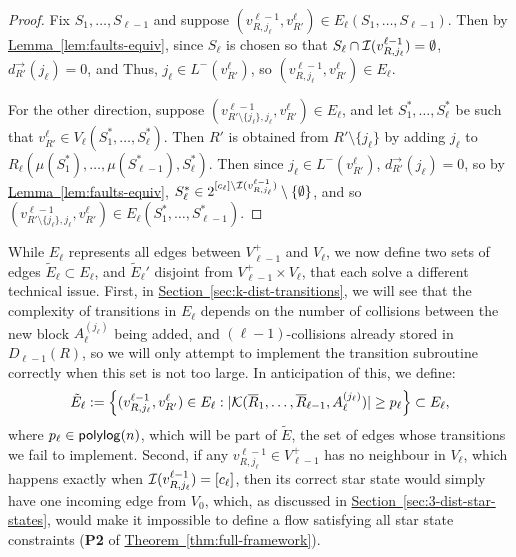 \documentclass{article}
\renewcommand{\sec}[1]{\hyperref[sec:#1]{Section~\ref*{sec:#1}}}
\newcommand{\thm}[1]{\hyperref[thm:#1]{Theorem~\ref*{thm:#1}}}
\newcommand{\lem}[1]{\hyperref[lem:#1]{Lemma~\ref*{lem:#1}}}
\renewcommand{\>}{\rangle}
\newcommand{\<}{\langle}
\renewcommand{\(}{\left(}
\renewcommand{\)}{\right)}
\begin{document}
\begin{proof}
Fix $S_1,\dots,S_{\ell-1}$ and suppose $(v_{R,j_{\ell}}^{\ell-1},v_{R'}^{\ell})\in {E}_{\ell}(S_1,\dots,S_{\ell-1})$. Then by \lem{faults-equiv}, since $S_{\ell}$ is chosen so that $S_{\ell}\cap {\cal I}(v_{R,j_{\ell}}^{\ell-1})=\emptyset$,
$d_{R'}^{\rightarrow}(j_{\ell})=0$, and Thus, $j_{\ell}\in L^-(v_{R'}^{\ell})$, so $(v_{R,j_{\ell}}^{\ell-1},v_{R'}^{\ell})\in E_{\ell}$.


For the other direction, suppose $\left(v^{\ell-1}_{R'\setminus\{j_{\ell}\},j_{\ell}},v^{\ell}_{R'}\right)\in E_{\ell}$, and let $S_1^*,\dots,S_{\ell}^*$ be such that $v^{\ell}_{R'}\in V_{\ell}(S_1^*,\dots,S_{\ell}^*)$. Then $R'$ is obtained from $R'\setminus\{j_{\ell}\}$ by adding $j_{\ell}$ to $R_{\ell}(\mu(S_1^*),\dots,\mu(S_{\ell-1}^*),S_{\ell}^*)$. Then since $j_{\ell}\in L^-(v_{R'}^{\ell})$, $d_{R'}^{\rightarrow}(j_{\ell})=0$, so by \lem{faults-equiv}, $S_{\ell}^*\in 2^{[c_{\ell}]\setminus{\cal I}(v_{R,j_{\ell}}^{\ell-1})}\setminus\{\emptyset\}$, and so $\left(v^{\ell-1}_{R'\setminus\{j_{\ell}\},j_{\ell}},v^{\ell}_{R'}\right)\in E_{\ell}(S_1^*,\dots,S_{\ell-1}^*)$.
\end{proof}
While $E_{\ell}$ represents all edges between $V_{\ell-1}^{+}$ and $V_{\ell}$, we now define two sets of edges $\tilde{E}_{\ell}\subset E_{\ell}$, and $\tilde{E}_{\ell}'$ disjoint from $V_{\ell-1}^+\times V_{\ell}$, that each solve a different technical issue. First, in \sec{k-dist-transitions}, we will see that the complexity of transitions in $E_{\ell}$ depends on the number of collisions between the new block $A_{\ell}^{(j_{\ell})}$ being added, and $(\ell-1)$-collisions already stored in $D_{\ell-1}(R)$, so we will only attempt to implement the transition subroutine correctly when this set is not too large. In anticipation of this, we define:
\begin{equation}
	\tilde{E}_{\ell}:=\left\{(v^{\ell-1}_{R,j_{\ell}},v^{\ell}_{R'})\in E_{\ell}: |{\cal K}(\overline{R}_1,\dots,\overline{R}_{\ell-1},A_{\ell}^{(j_{\ell})})| \geq p_{\ell}
	\right\}\subset E_{\ell},\label{eq:k-dist-tilde-E-ell}
\end{equation}
where $p_{\ell}\in {\sf polylog}(n)$,
which will be part of $\tilde{E}$, the set of edges whose transitions we fail to implement. 
Second, if any $v_{R,j_{\ell}}^{\ell-1}\in V_{\ell-1}^+$ has no neighbour in $V_{\ell}$, which happens exactly when ${\cal I}(v_{R,j_{\ell}}^{\ell-1})=[c_{\ell}]$, then its correct star state would simply have one incoming edge from $V_0$, which, as discussed in \sec{3-dist-star-states}, would make it impossible to define a flow satisfying all star state constraints (\textbf{P2} of \thm{full-framework}).
\end{document}
